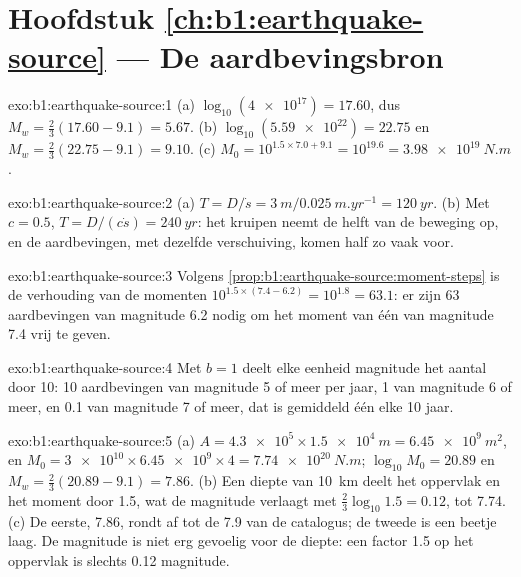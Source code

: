 \section*{Hoofdstuk \ref{ch:b1:earthquake-source} --- De aardbevingsbron}

\begin{solution}{exo:b1:earthquake-source:1}
(a) $\log_{10}(\num{4e17}) = 17.60$, dus $M_w = \tfrac23(17.60 - 9.1) = 5.67$.
(b) $\log_{10}(\num{5.59e22}) = 22.75$ en $M_w = \tfrac23(22.75 - 9.1) =
9.10$. (c) $M_0 = 10^{1.5\times7.0 + 9.1} = 10^{19.6} = \qty{3.98e19}{N.m}$.
\end{solution}

\begin{solution}{exo:b1:earthquake-source:2}
(a) $T = D/\dot s = \qty{3}{m}/\qty{0.025}{m.yr^{-1}} = \qty{120}{yr}$.
(b) Met $c = 0.5$, $T = D/(c\dot s) = \qty{240}{yr}$: het kruipen neemt de helft van
de beweging op, en de aardbevingen, met dezelfde verschuiving, komen half zo vaak voor.
\end{solution}

\begin{solution}{exo:b1:earthquake-source:3}
Volgens \cref{prop:b1:earthquake-source:moment-steps} is de verhouding van de momenten
$10^{1.5\times(7.4 - 6.2)} = 10^{1.8} = 63.1$: er zijn 63 aardbevingen van
magnitude 6.2 nodig om het moment van één van magnitude 7.4 vrij te geven.
\end{solution}

\begin{solution}{exo:b1:earthquake-source:4}
Met $b = 1$ deelt elke eenheid magnitude het aantal door 10: 10 aardbevingen van
magnitude 5 of meer per jaar, 1 van magnitude 6 of meer, en 0.1 van magnitude 7 of
meer, dat is gemiddeld één elke 10 jaar.
\end{solution}

\begin{solution}{exo:b1:earthquake-source:5}
(a) $A = \num{4.3e5} \times \qty{1.5e4}{m} = \qty{6.45e9}{m^2}$, en
$M_0 = \num{3e10}\times\num{6.45e9}\times4 = \qty{7.74e20}{N.m}$;
$\log_{10}M_0 = 20.89$ en $M_w = \tfrac23(20.89 - 9.1) = 7.86$. (b) Een diepte van
\qty{10}{km} deelt het oppervlak en het moment door 1.5, wat de magnitude verlaagt met
$\tfrac23\log_{10}1.5 = 0.12$, tot 7.74. (c) De eerste, 7.86, rondt af tot de 7.9 van
de catalogus; de tweede is een beetje laag. De magnitude is niet erg gevoelig voor de
diepte: een factor 1.5 op het oppervlak is slechts 0.12 magnitude.
\end{solution}

